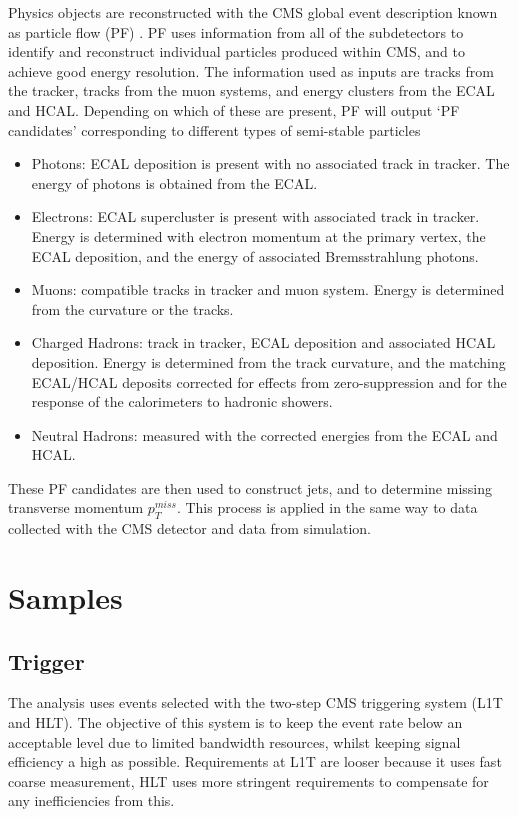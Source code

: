 Physics objects are reconstructed with the CMS global event description known as particle flow (PF) \cite{ParticleFlow}.
PF uses information from all of the subdetectors to identify and reconstruct individual particles produced within CMS, and to achieve good energy resolution.
The information used as inputs are tracks from the tracker, tracks from the muon systems, and energy clusters from the ECAL and HCAL. Depending on which of these are present, PF will output `PF candidates' corresponding to different types of semi-stable particles 
\begin{itemize}[noitemsep]
    \item Photons: ECAL deposition is present with no associated track in tracker. The energy of photons is obtained from the ECAL. 
    \item Electrons: ECAL supercluster is present with associated track in tracker. Energy is determined with electron momentum at the primary vertex, the ECAL deposition, and the energy of associated Bremsstrahlung photons. 
    \item Muons: compatible tracks in tracker and muon system. Energy is determined from the curvature or the tracks. 
    \item Charged Hadrons: track in tracker, ECAL deposition and associated HCAL deposition. Energy is determined from the track curvature, and the matching ECAL/HCAL deposits corrected for effects from zero-suppression and for the response of the calorimeters to hadronic showers.
    \item Neutral Hadrons: measured with the corrected energies from the ECAL and HCAL. 
\end{itemize}
These PF candidates are then used to construct jets, and to determine missing transverse momentum $p_{T}^{miss}$.
This process is applied in the same way to data collected with the CMS detector and data from simulation.


\section{Samples}

\subsection{Trigger}
The analysis uses events selected with the two-step CMS triggering system (L1T and HLT). The objective of this system is to keep the event rate below an acceptable level due to limited bandwidth resources, whilst keeping signal efficiency a high as possible. Requirements at L1T are looser because it uses fast coarse measurement, HLT uses more stringent requirements to compensate for any inefficiencies from this. 

